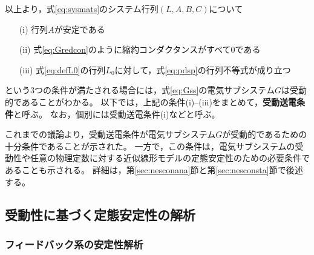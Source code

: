 \documentclass[tombow,dvipdfmx]{corona-a5-1.1}
\begin{document}
以上より，式\ref{eq:sysmats}のシステム行列$(L,A,B,C)$について
\begin{itemize}
\item[(i)] 行列$A$が安定である
\item[(ii)] 式\ref{eq:Gredcon}のように縮約コンダクタンスがすべて0である
\item[(iii)] 式\ref{eq:defL0}の行列$L_0$に対して，式\ref{eq:pdsp}の行列不等式が成り立つ
\end{itemize}
という3つの条件が満たされる場合には，式\ref{eq:Gss}の電気サブシステム$G$は受動的であることがわかる。
以下では，上記の条件(i)--(iii)をまとめて，\textbf{受動送電条件}と呼ぶ。
なお，個別には受動送電条件(i)などと呼ぶ。

これまでの議論より，受動送電条件が電気サブシステム$G$が受動的であるための十分条件であることが示された。
一方で，この条件は，電気サブシステムの受動性や任意の物理定数に対する近似線形モデルの定態安定性のための必要条件であることも示される。
詳細は，第\ref{sec:nesconana}節と第\ref{sec:nesconsta}節で後述する。

\subsection{受動性に基づく定態安定性の解析\advanced}

\subsubsection{フィードバック系の安定性解析}
\end{document}
